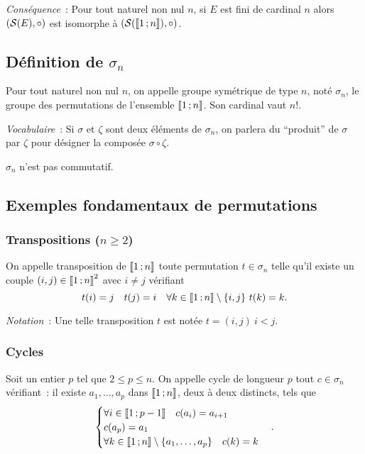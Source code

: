 \emph{Conséquence}~: Pour tout naturel non nul \(n\), si \(E\) est fini de cardinal \(n\) alors \((\S(E),\circ)\) est isomorphe à  \((\S(\intervalleentier{1}{n}),\circ)\).

\subsection{Définition de \(\sigma_n\)}

\begin{defdef}
  Pour tout naturel non nul \(n\), on appelle groupe symétrique de type \(n\), noté \(\sigma_n\), le groupe des permutations de l'ensemble \(\intervalleentier{1}{n}\). Son cardinal vaut \(n\)!.
\end{defdef}

\emph{Vocabulaire}~: Si \(\sigma\) et \(\zeta\) sont deux éléments de \(\sigma_n\), on parlera du ``produit'' de \(\sigma\) par \(\zeta\) pour désigner la composée \(\sigma \circ \zeta\).

\danger \(\sigma_n\) n'est pas commutatif.

\subsection{Exemples fondamentaux de permutations}

\subsubsection{Transpositions (\(n\geqslant 2\))}

\begin{defdef}
  On appelle transposition de \(\intervalleentier{1}{n}\) toute permutation \(t \in \sigma_n\) telle qu'il existe un couple \((i,j) \in \intervalleentier{1}{n}^2\) avec \(i\neq j\) vérifiant
  \begin{equation}
    t(i) = j \quad t(j) = i \quad \forall k \in \intervalleentier{1}{n} \setminus\{i,j\} \ t(k) = k.
  \end{equation}
\end{defdef}

\emph{Notation}~: Une telle transposition \(t\) est notée \(t = (i,j) \ i<j\).

\subsubsection{Cycles}

\begin{defdef}
  Soit un entier \(p\) tel que \(2 \leqslant p \leqslant n\). On appelle cycle de longueur \(p\) tout \(c \in \sigma_n\) vérifiant~: il existe \(a_1, \ldots, a_p\) dans \(\intervalleentier{1}{n}\), deux à deux distincts, tels que
  \begin{equation}
    \begin{cases}
      \forall i \in \intervalleentier{1}{p-1} \quad c(a_i) = a_{i+1} \\
      c(a_p) = a_1\\
      \forall k \in \intervalleentier{1}{n} \setminus \{a_1, \ldots, a_p\} \quad c(k) = k
    \end{cases}.
  \end{equation}
\end{defdef}


